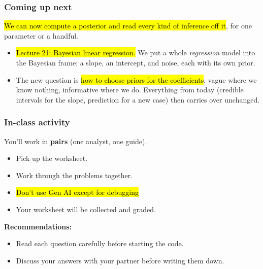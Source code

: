 \documentclass[slidestop,compress,mathserif]{beamer}
\begin{document}
\begin{frame}
\frametitle{Coming up next}

\hl{We can now compute a posterior and read every kind of inference off it}, for one parameter or a handful.

\vspace{0.4em}
\begin{itemize}
\item \hl{Lecture 21: Bayesian linear regression.} We put a whole \emph{regression} model into the Bayesian frame: a slope, an intercept, and noise, each with its own prior.
\pause
\item The new question is \hl{how to choose priors for the coefficients}: vague where we know nothing, informative where we do. Everything from today (credible intervals for the slope, prediction for a new case) then carries over unchanged.
\end{itemize}
\end{frame}

\begin{frame}
\frametitle{In-class activity}

You'll work in \textbf{pairs} (one analyst, one guide).

\medskip
\begin{itemize}
\item Pick up the worksheet.
\item Work through the problems together.
\item \hl{Don't use Gen AI except for debugging}
\item Your worksheet will be collected and graded.
\end{itemize}

\medskip
\textbf{Recommendations:}
\begin{itemize}
\item Read each question carefully before starting the code.
\item Discuss your answers with your partner before writing them down.
\end{itemize}

\end{frame}
\end{document}
